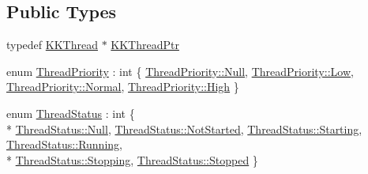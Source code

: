 \subsection*{Public Types}
\begin{DoxyCompactItemize}
\item 
typedef \hyperlink{class_k_k_b_1_1_k_k_thread}{K\+K\+Thread} $\ast$ \hyperlink{class_k_k_b_1_1_k_k_thread_ae0ca65f275a57c346e71486ad84b271a}{K\+K\+Thread\+Ptr}
\item 
enum \hyperlink{class_k_k_b_1_1_k_k_thread_ad9b55cc20284bcadd051a20945325e0c}{Thread\+Priority} \+: int \{ \hyperlink{class_k_k_b_1_1_k_k_thread_ad9b55cc20284bcadd051a20945325e0cabbb93ef26e3c101ff11cdd21cab08a94}{Thread\+Priority\+::\+Null}, 
\hyperlink{class_k_k_b_1_1_k_k_thread_ad9b55cc20284bcadd051a20945325e0ca28d0edd045e05cf5af64e35ae0c4c6ef}{Thread\+Priority\+::\+Low}, 
\hyperlink{class_k_k_b_1_1_k_k_thread_ad9b55cc20284bcadd051a20945325e0ca960b44c579bc2f6818d2daaf9e4c16f0}{Thread\+Priority\+::\+Normal}, 
\hyperlink{class_k_k_b_1_1_k_k_thread_ad9b55cc20284bcadd051a20945325e0ca655d20c1ca69519ca647684edbb2db35}{Thread\+Priority\+::\+High}
 \}
\item 
enum \hyperlink{class_k_k_b_1_1_k_k_thread_a3f72bb1988ae5dd353b39260ae0acc72}{Thread\+Status} \+: int \{ \\*
\hyperlink{class_k_k_b_1_1_k_k_thread_a3f72bb1988ae5dd353b39260ae0acc72abbb93ef26e3c101ff11cdd21cab08a94}{Thread\+Status\+::\+Null}, 
\hyperlink{class_k_k_b_1_1_k_k_thread_a3f72bb1988ae5dd353b39260ae0acc72afa7be7845bc42b3491d9d0377958be94}{Thread\+Status\+::\+Not\+Started}, 
\hyperlink{class_k_k_b_1_1_k_k_thread_a3f72bb1988ae5dd353b39260ae0acc72ac2efe4bbd13e6cb0db293e72884273c0}{Thread\+Status\+::\+Starting}, 
\hyperlink{class_k_k_b_1_1_k_k_thread_a3f72bb1988ae5dd353b39260ae0acc72a5bda814c4aedb126839228f1a3d92f09}{Thread\+Status\+::\+Running}, 
\\*
\hyperlink{class_k_k_b_1_1_k_k_thread_a3f72bb1988ae5dd353b39260ae0acc72a7b7ecb39b9e110c2a31409a1672bad23}{Thread\+Status\+::\+Stopping}, 
\hyperlink{class_k_k_b_1_1_k_k_thread_a3f72bb1988ae5dd353b39260ae0acc72ac23e2b09ebe6bf4cb5e2a9abe85c0be2}{Thread\+Status\+::\+Stopped}
 \}
\end{DoxyCompactItemize}

